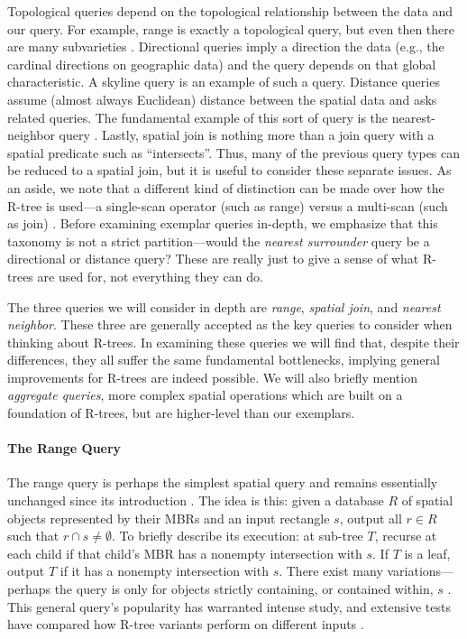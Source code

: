 Topological queries depend on the topological relationship between the data and our query.
For example, range is exactly a topological query, but even then there are many subvarieties \cite{papadiassellistheodoridisegenhofer95,gaedegunther98}.
Directional queries imply a direction the data (e.g., the cardinal directions on geographic data) and the query depends on that global characteristic.
A skyline query \cite{papadiastaofuseeger05} is an example of such a query.
Distance queries assume (almost always Euclidean) distance between the spatial data and asks related queries.
The fundamental example of this sort of query is the nearest-neighbor query \cite{roussopouloskelleyvincent95}.
Lastly, spatial join is nothing more than a join query with a spatial predicate \cite{brinkhoffkriegelseeger93} such as ``intersects''.
Thus, many of the previous query types can be reduced to a spatial join, but it is useful to consider these separate issues.
As an aside, we note that a different kind of distinction can be made over how the R-tree is used---a single-scan operator (such as range) versus a multi-scan (such as join) \cite{brinkhoffkriegelseeger93,samet90}.
Before examining exemplar queries in-depth, we emphasize that this taxonomy is not a strict partition---would the \emph{nearest surrounder} query \cite{leeleeleong10} be a directional or distance query?
These are really just to give a sense of what R-trees are used for, not everything they can do.

The three queries we will consider in depth are \emph{range}, \emph{spatial join}, and \emph{nearest neighbor}.
These three are generally accepted as the key queries to consider when thinking about R-trees.
In examining these queries we will find that, despite their differences, they all suffer the same fundamental bottlenecks, implying general improvements for R-trees are indeed possible.
We will also briefly mention \emph{aggregate queries}, more complex spatial operations which are built on a foundation of R-trees, but are higher-level than our exemplars.

\paragraph{The Range Query}
The range query is perhaps the simplest spatial query and remains essentially unchanged since its introduction \cite{guttman84}.
The idea is this: given a database $R$ of spatial objects represented by their MBRs and an input rectangle $s$, output all $r\in R$ such that $r\cap s\neq\emptyset$.
To briefly describe its execution: at sub-tree $T$, recurse at each child if that child's MBR has a nonempty intersection with $s$.
If $T$ is a leaf, output $T$ if it has a nonempty intersection with $s$.
There exist many variations---perhaps the query is only for objects strictly containing, or contained within, $s$ \cite{gaedegunther98}.
This general query's popularity has warranted intense study, and extensive tests have compared how R-tree variants perform on different inputs \cite{papadiassellistheodoridisegenhofer95}.

